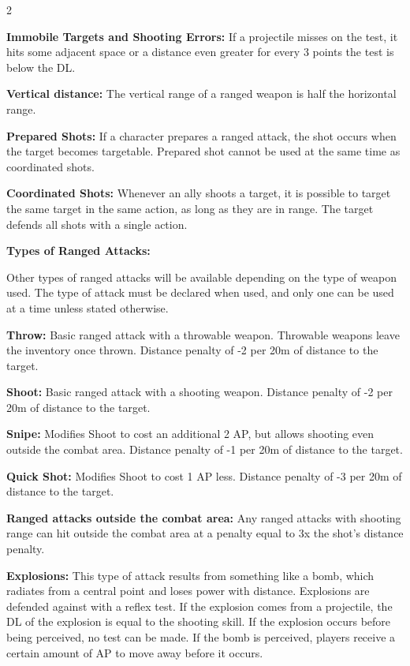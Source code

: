 \begin{multicols}{2}
{\textbf{Immobile Targets and Shooting Errors:} If a projectile misses on the test, it hits some adjacent space or a distance even greater for every 3 points the test is below the DL.

\textbf{Vertical distance:} The vertical range of a ranged weapon is half the horizontal range.


\textbf{Prepared Shots:} If a character prepares a ranged attack, the shot occurs when the target becomes targetable. Prepared shot cannot be used at the same time as coordinated shots.

\textbf{Coordinated Shots:} Whenever an ally shoots a target, it is possible to target the same target in the same action, as long as they are in range. The target defends all shots with a single action. 

\textbf{\large Types of Ranged Attacks:}

Other types of ranged attacks will be available depending on the type of weapon used. The type of attack must be declared when used, and only one can be used at a time unless stated otherwise.

\textbf{Throw:} Basic ranged attack with a throwable weapon. Throwable weapons leave the inventory once thrown. Distance penalty of -2 per 20m of distance to the target.

\textbf{Shoot:} Basic ranged attack with a shooting weapon. Distance penalty of -2 per 20m of distance to the target.

\textbf{Snipe:} Modifies Shoot to cost an additional 2 AP, but allows shooting even outside the combat area. Distance penalty of -1 per 20m of distance to the target.

\textbf{Quick Shot:} Modifies Shoot to cost 1 AP less. Distance penalty of -3 per 20m of distance to the target.

\textbf{Ranged attacks outside the combat area:} Any ranged attacks with shooting range can hit outside the combat area at a penalty equal to 3x the shot's distance penalty.
}

\textbf{\large Explosions:} This type of attack results from something like a bomb, which radiates from a central point and loses power with distance. Explosions are defended against with a reflex test. If the explosion comes from a projectile, the DL of the explosion is equal to the shooting skill. If the explosion occurs before being perceived, no test can be made. If the bomb is perceived, players receive a certain amount of AP to move away before it occurs.


\end{multicols}
